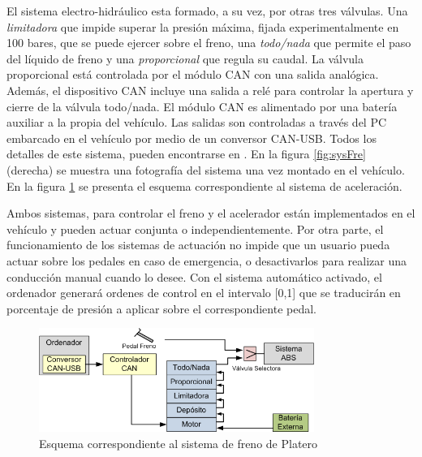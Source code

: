 El sistema electro-hidráulico esta formado, a su vez, por otras tres válvulas. Una \textit{limitadora} que impide superar la presión máxima, fijada experimentalmente en 100 bares, que se puede ejercer sobre el freno, una \textit{todo/nada} que permite el paso del líquido de freno y una \textit{proporcional} que regula su caudal. La válvula proporcional está controlada por el módulo \gls{CAN} con una salida analógica. Además, el dispositivo \gls{CAN} incluye una salida a relé para controlar la apertura y cierre de la válvula todo/nada. El módulo \gls{CAN} es alimentado por una batería auxiliar a la propia del vehículo. Las salidas son controladas a través del PC embarcado en el vehículo por medio de un conversor \gls{CAN}-USB. Todos los detalles de este sistema, pueden encontrarse en \cite{Milanes2010}. En la figura \ref{fig:sysFre} (derecha) se muestra una fotografía del sistema una vez montado en el vehículo. En la figura \ref{fig:esfreno} se presenta el esquema correspondiente al sistema de aceleración.

Ambos sistemas, para controlar el freno y el acelerador están implementados en el vehículo y pueden actuar conjunta o independientemente. Por otra parte, el funcionamiento de los sistemas de actuación no impide que un usuario pueda actuar sobre los pedales en caso de emergencia, o desactivarlos para realizar una conducción manual cuando lo desee. Con el sistema automático activado, el ordenador generará ordenes de control en el intervalo [0,1] que se traducirán en porcentaje de presión a aplicar sobre el correspondiente pedal.

\begin{figure}[htb]
\centering
\includegraphics[width=0.8\textwidth]{figures/FuncionamientoFreno.png}
\caption{Esquema correspondiente al sistema de freno de Platero}
\label{fig:esfreno}
\end{figure}